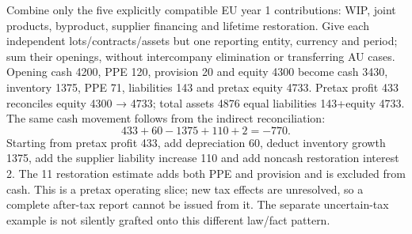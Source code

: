 Combine only the five explicitly compatible EU year 1 contributions: WIP, joint products, byproduct, supplier financing and lifetime restoration. Give each independent lots/contracts/assets but one reporting entity, currency and period; sum their openings, without intercompany elimination or transferring AU cases. Opening cash 4200, PPE 120, provision 20 and equity 4300 become cash 3430, inventory 1375, PPE 71, liabilities 143 and pretax equity 4733. Pretax profit 433 reconciles equity 4300 → 4733; total assets 4876 equal liabilities 143+equity 4733. The same cash movement follows from the indirect reconciliation:
\[433+60-1375+110+2=-770.\]
Starting from pretax profit 433, add depreciation 60, deduct inventory growth 1375, add the supplier liability increase 110 and add noncash restoration interest 2. The 11 restoration estimate adds both PPE and provision and is excluded from cash. This is a pretax operating slice; new tax effects are unresolved, so a complete after-tax report cannot be issued from it. The separate uncertain-tax example is not silently grafted onto this different law/fact pattern.
